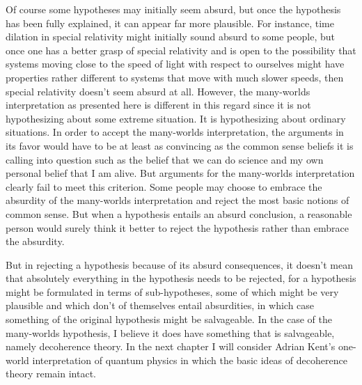        Of course some hypotheses may initially seem absurd, but once the hypothesis has been fully explained, it can appear far more plausible. For instance, time dilation in special relativity might initially sound absurd to some people, but once one has a better grasp of special relativity and is open to the possibility that  systems moving close to the speed of light with respect to ourselves might have properties rather different to systems that move with much slower speeds, then special relativity doesn't seem absurd at all. However, the many-worlds interpretation as presented here is different in this regard since it is not hypothesizing about some extreme situation. It is hypothesizing about ordinary situations. In order to accept the many-worlds interpretation, the arguments in its favor would have to be at least as convincing as the common sense beliefs it is calling into question such as the belief that we can do science and my own personal belief that I am alive. But arguments for the many-worlds interpretation clearly fail to meet this criterion. Some people may choose to embrace the absurdity of the many-worlds interpretation and reject the most basic notions of common sense. But when a hypothesis entails an absurd conclusion, a reasonable person would surely think it better to reject the hypothesis rather than embrace the absurdity. 
         
        But in rejecting a hypothesis because of its absurd consequences, it doesn't mean that absolutely everything in the hypothesis needs to be rejected, for  a hypothesis might be formulated in terms of sub-hypotheses, some of which might be very plausible and which don't of themselves entail absurdities, in which case something of the original hypothesis might be salvageable. In the case of the many-worlds hypothesis, I believe it does have something that is salvageable, namely decoherence theory. In the next chapter I will consider Adrian Kent's one-world interpretation of quantum physics in which the basic ideas of decoherence theory remain intact.
       
       
